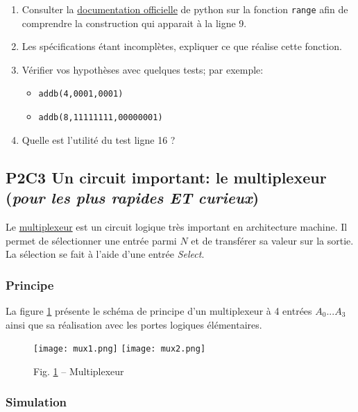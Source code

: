 \documentclass[11pt,french]{article}
\makeatletter
\def\maxwidth{\ifdim\Gin@nat@width>\linewidth\linewidth
    \else\Gin@nat@width\fi}
\let\Oldincludegraphics\includegraphics
\renewcommand{\includegraphics}[1]{\Oldincludegraphics[width=.8\maxwidth]{#1}}
\providecommand{\tightlist}{%
      \setlength{\itemsep}{0pt}\setlength{\parskip}{0pt}}
\makeatother
\begin{document}
    \begin{enumerate}
\tightlist
\item
  Consulter la
  \href{https://docs.python.org/fr/3/library/stdtypes.html?highlight=range\#range}{documentation
  officielle} de python sur la fonction \texttt{range} afin de comprendre la
  construction qui apparait à la ligne 9.
\item
  Les spécifications étant incomplètes, expliquer ce que réalise cette
  fonction.
\item
  Vérifier vos hypothèses avec quelques tests; par exemple:
  \begin{itemize}
\item
  \texttt{addb(4,\textquotesingle{}0001\textquotesingle{},\textquotesingle{}0001\textquotesingle{})}
\item
  \texttt{addb(8,\textquotesingle{}11111111\textquotesingle{},\textquotesingle{}00000001\textquotesingle{})}
  \end{itemize}
\item
  Quelle est l'utilité du test ligne 16 ?
\end{enumerate}

    \hypertarget{p2c3-un-circuit-important-le-multiplexeur-pour-les-plus-rapides-et-curieux}{%
\subsection{\texorpdfstring{P2C3 Un circuit important: le multiplexeur
(\emph{pour les plus rapides ET
curieux})}{P2C3 Un circuit important: le multiplexeur (pour les plus rapides ET curieux)}}\label{p2c3-un-circuit-important-le-multiplexeur-pour-les-plus-rapides-et-curieux}}

Le \href{https://fr.wikipedia.org/wiki/Multiplexeur}{multiplexeur} est
un circuit logique très important en architecture machine. Il permet de
sélectionner une entrée parmi \(N\) et de transférer sa valeur sur la
sortie. La sélection se fait à l'aide d'une entrée \emph{Select}.

\hypertarget{principe}{%
\subsubsection{Principe}\label{principe}}

La figure \ref{fig:mux} présente le schéma de principe d'un multiplexeur à
4 entrées \(A_0 ... A_3\) ainsi que sa réalisation avec les portes
logiques élémentaires.
\begin{figure}[h]
	\begin{center}
		\texttt{[image: mux1.png]}
		\texttt{[image: mux2.png]}
	\end{center}
	\caption{Fig. \ref{fig:mux} -- Multiplexeur}
	\label{fig:mux}
\end{figure}	
\hypertarget{simulation}{%
\subsubsection{Simulation}\label{simulation}}
\end{document}

